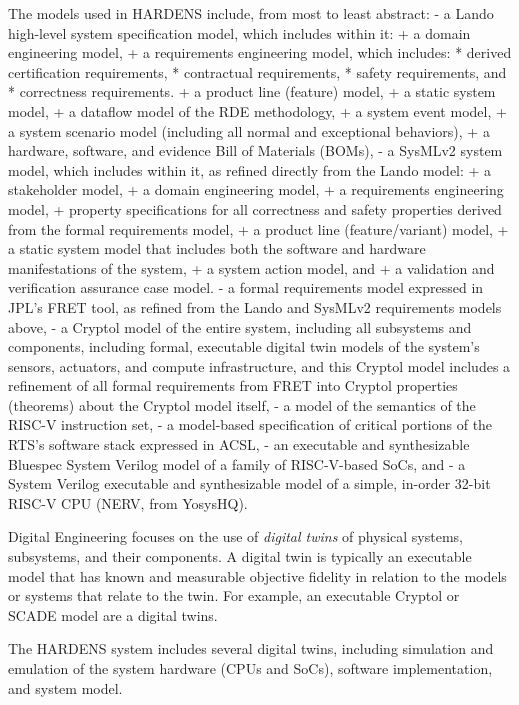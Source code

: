 \documentclass[11pt]{article}
\begin{document}
The models used in HARDENS include, from most to least abstract: - a
Lando high-level system specification model, which includes within it: +
a domain engineering model, + a requirements engineering model, which
includes: * derived certification requirements, * contractual
requirements, * safety requirements, and * correctness requirements. + a
product line (feature) model, + a static system model, + a dataflow
model of the RDE methodology, + a system event model, + a system
scenario model (including all normal and exceptional behaviors), + a
hardware, software, and evidence Bill of Materials (BOMs), - a SysMLv2
system model, which includes within it, as refined directly from the
Lando model: + a stakeholder model, + a domain engineering model, + a
requirements engineering model, + property specifications for all
correctness and safety properties derived from the formal requirements
model, + a product line (feature/variant) model, + a static system model
that includes both the software and hardware manifestations of the
system, + a system action model, and + a validation and verification
assurance case model. - a formal requirements model expressed in JPL's
FRET tool, as refined from the Lando and SysMLv2 requirements models
above, - a Cryptol model of the entire system, including all subsystems
and components, including formal, executable digital twin models of the
system's sensors, actuators, and compute infrastructure, and this
Cryptol model includes a refinement of all formal requirements from FRET
into Cryptol properties (theorems) about the Cryptol model itself, - a
model of the semantics of the RISC-V instruction set, - a model-based
specification of critical portions of the RTS's software stack expressed
in ACSL, - an executable and synthesizable Bluespec System Verilog model
of a family of RISC-V-based SoCs, and - a System Verilog executable and
synthesizable model of a simple, in-order 32-bit RISC-V CPU (NERV, from
YosysHQ).

Digital Engineering focuses on the use of \emph{digital twins} of
physical systems, subsystems, and their components. A digital twin is
typically an executable model that has known and measurable objective
fidelity in relation to the models or systems that relate to the twin.
For example, an executable Cryptol or SCADE model are a digital twins.

The HARDENS system includes several digital twins, including simulation
and emulation of the system hardware (CPUs and SoCs), software
implementation, and system model.
\end{document}
